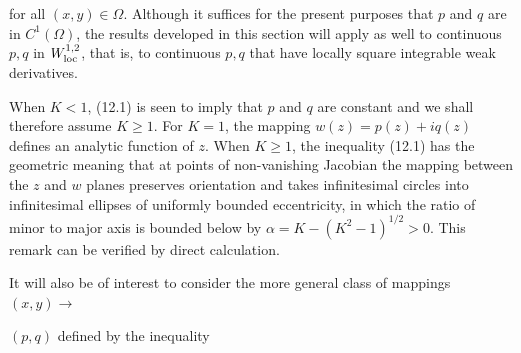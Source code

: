 for all $(x,y)\in\Omega$. Although it suffices for the present purposes that $p$ and $q$ are in $C^1(\Omega)$, the results developed in this section will apply as well to continuous $p,q$ in $W^{1,2}_{\mathrm{loc}}$, that is, to continuous $p,q$ that have locally square integrable weak derivatives.

When $K<1$, (12.1) is seen to imply that $p$ and $q$ are constant and we shall therefore assume $K\ge 1$. For $K=1$, the mapping $w(z)=p(z)+iq(z)$ defines an analytic function of $z$. When $K\ge 1$, the inequality (12.1) has the geometric meaning that at points of non-vanishing Jacobian the mapping between the $z$ and $w$ planes preserves orientation and takes infinitesimal circles into infinitesimal ellipses of uniformly bounded eccentricity, in which the ratio of minor to major axis is bounded below by $\alpha=K-(K^2-1)^{1/2}>0$. This remark can be verified by direct calculation.

It will also be of interest to consider the more general class of mappings $(x,y)\to$

$(p,q)$ defined by the inequality
